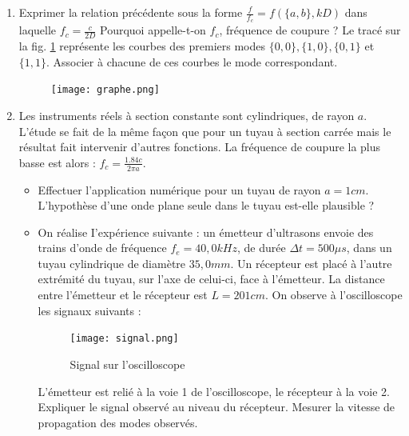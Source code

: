 \documentclass{article}
\begin{document}
\begin{enumerate}
  \item Exprimer la relation précédente  sous la forme ${\frac{f}{f_{c}}}=f(\{a,b\},k D)$ dans laquelle $f_c=\frac{c}{2D}$
  Pourquoi appelle-t-on $f_c$, fréquence de coupure ?
  Le tracé sur la fig. \ref{fig:graphe} représente les courbes des premiers modes $\{0,0\}, \{1,0\}, \{0,1\}$ et $\{1,1\}$.
  Associer à chacune de ces courbes le mode correspondant.


  
  
  \begin{figure}[h]
    \centering
    \texttt{[image: graphe.png]}
    \caption{}

    \label{fig:graphe}
  \end{figure}



  


  \item Les instruments réels à section constante sont cylindriques, de rayon $a$. L’étude se fait de
  la même façon que pour un tuyau à section carrée mais le résultat fait intervenir d’autres fonctions. 
  La fréquence de coupure la plus basse est alors : $\scriptstyle f_{c}={\frac{1.84c}{2\pi a}}.$
  \begin {itemize}

    \item Effectuer l’application numérique pour un tuyau de rayon $a = 1 cm$. L'hypothèse d’une
   onde plane seule dans le tuyau est-elle plausible ?
    \item On réalise I'expérience suivante : un émetteur d’ultrasons envoie des trains d’onde de fréquence
    $f_e = 40,0 kHz$, de durée $\Delta t = 500 \mu s$, dans un tuyau cylindrique de diamètre $35,0 mm$.
    Un récepteur est placé à l’autre extrémité du tuyau, sur l’axe de celui-ci, face à l’émetteur.
    La distance entre l’émetteur et le récepteur est $L = 201 cm$. On observe à l’oscilloscope les signaux suivants :


    \begin{figure}[h]
      \centering
      \texttt{[image: signal.png]}
      \label{fig:signal}
      \caption{Signal sur l'oscilloscope}
    \end{figure}

    L'émetteur est relié à la voie 1 de l’oscilloscope, le récepteur à la voie 2.
  Expliquer le signal observé au niveau du récepteur.
  Mesurer la vitesse de propagation des modes observés.


  \end{itemize}


\end{enumerate}
\end{document}

